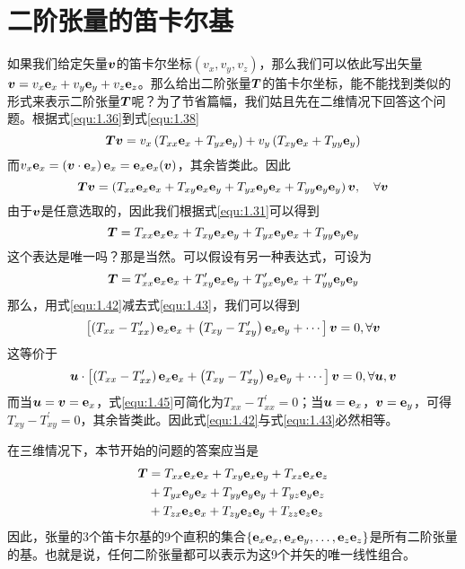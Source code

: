 \section{二阶张量的笛卡尔基}
如果我们给定矢量$\bb{v}$的笛卡尔坐标$(v_x,v_y,v_z)$，那么我们可以依此写出矢量$\bb{v}=v_x\bf{e}_x+v_y\bf{e}_y+v_z\bf{e}_z$。那么给出二阶张量$\bb{T}$的笛卡尔坐标，能不能找到类似的形式来表示二阶张量$\bb{T}$呢？为了节省篇幅，我们姑且先在二维情况下回答这个问题。根据式\eqref{equ:1.36}到式\eqref{equ:1.38}
\begin{equation}\label{equ:1.40}
    \bb{Tv}=v_x\left( T_{xx}\bf{e}_x+T_{yx}\bf{e}_y \right) +v_y\left( T_{xy}\bf{e}_x+T_{yy}\bf{e}_y \right) 
\end{equation}
而$v_x\bf{e}_x=\left( \bb{v}\cdot \bf{e}_x \right) \bf{e}_x=\bf{e}_x\bf{e}_x(\bb{v})$，其余皆类此。因此
\begin{equation}\label{equ:1.41}
    \bb{Tv}=\left( T_{xx}\bf{e}_x\bf{e}_x+T_{xy}\bf{e}_x\bf{e}_y+T_{yx}\bf{e}_y\bf{e}_x+T_{yy}\bf{e}_y\bf{e}_y \right) \bb{v},\quad \forall \bb{v}
\end{equation}
由于$\bb{v}$是任意选取的，因此我们根据式\eqref{equ:1.31}可以得到
\begin{equation}\label{equ:1.42}
    \bb{T}=T_{xx}\bf{e}_x\bf{e}_x+T_{xy}\bf{e}_x\bf{e}_y+T_{yx}\bf{e}_y\bf{e}_x+T_{yy}\bf{e}_y\bf{e}_y
\end{equation}
这个表达是唯一吗？那是当然。可以假设有另一种表达式，可设为
\begin{equation}\label{equ:1.43}
    \bb{T}=T_{xx}^{\prime}\bf{e}_x\bf{e}_x+T_{xy}^{\prime}\bf{e}_x\bf{e}_y+T_{yx}^{\prime}\bf{e}_y\bf{e}_x+T_{yy}^{\prime}\bf{e}_y\bf{e}_y
\end{equation}
那么，用式\eqref{equ:1.42}减去式\eqref{equ:1.43}，我们可以得到
\begin{equation}\label{equ:1.44}
    \left[ \left( T_{xx}-T_{xx}^{\prime} \right) \bf{e}_x\bf{e}_x+\left( T_{xy}-T_{xy}^{\prime} \right) \bf{e}_x\bf{e}_y+\cdots \right] \bb{v}=0  ,\forall \bb{v}
\end{equation}
这等价于
\begin{equation}\label{equ:1.45}
    \bb{u}\cdot \left[ \left( T_{xx}-T_{xx}^{\prime} \right) \bf{e}_x\bf{e}_x+\left( T_{xy}-T_{xy}^{\prime} \right) \bf{e}_x\bf{e}_y+\cdots \right] \bb{v}=0  ,\forall \bb{u},\bb{v}
\end{equation}
而当$\bb{u}=\bb{v}=\bf{e}_x$，式\eqref{equ:1.45}可简化为$T_{xx}-T_{xx}^{\prime}=0$；当$\bb{u}=\bf{e}_x$，$\bb{v}=\bf{e}_y$，可得$T_{xy}-T_{xy}^{\prime}=0$，其余皆类此。因此式\eqref{equ:1.42}与式\eqref{equ:1.43}必然相等。

在三维情况下，本节开始的问题的答案应当是
\begin{align}
	\bb{T}&=T_{xx}\bf{e}_x\bf{e}_x+T_{xy}\bf{e}_x\bf{e}_y+T_{xz}\bf{e}_x\bf{e}_z\nonumber\\
	&+T_{yx}\bf{e}_y\bf{e}_x+T_{yy}\bf{e}_y\bf{e}_y+T_{yz}\bf{e}_y\bf{e}_z\nonumber\\
	&+T_{zx}\bf{e}_z\bf{e}_x+T_{zy}\bf{e}_z\bf{e}_y+T_{zz}\bf{e}_z\bf{e}_z\label{equ:1.46}
\end{align}
因此，张量的3个笛卡尔基的9个直积的集合$\left\{ \bf{e}_x\bf{e}_x,\bf{e}_x\bf{e}_y,\dots ,\bf{e}_z\bf{e}_z \right\} $是所有二阶张量的基。也就是说，任何二阶张量都可以表示为这9个并矢的唯一线性组合。